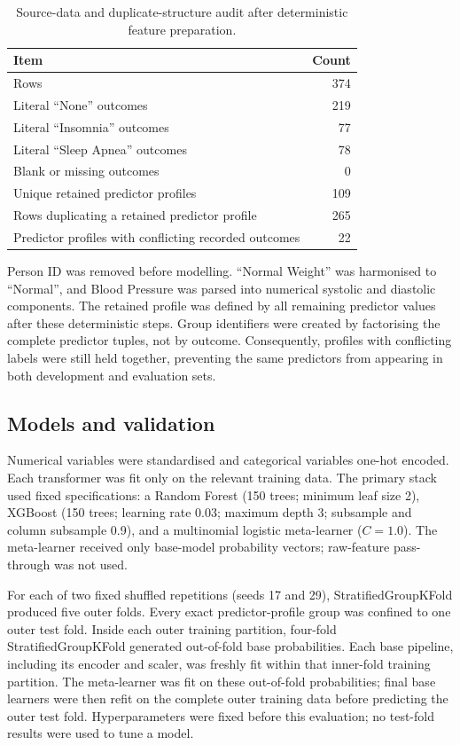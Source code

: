 \documentclass[preprint,12pt]{elsarticle}
\begin{document}
\begin{table}[t]
\centering
\caption{Source-data and duplicate-structure audit after deterministic feature preparation.}
\label{tab:audit}
\begin{tabular}{lr}
\toprule
Item & Count \\
\midrule
Rows & 374 \\
Literal ``None'' outcomes & 219 \\
Literal ``Insomnia'' outcomes & 77 \\
Literal ``Sleep Apnea'' outcomes & 78 \\
Blank or missing outcomes & 0 \\
Unique retained predictor profiles & 109 \\
Rows duplicating a retained predictor profile & 265 \\
Predictor profiles with conflicting recorded outcomes & 22 \\
\bottomrule
\end{tabular}
\end{table}

Person ID was removed before modelling. ``Normal Weight'' was harmonised to ``Normal'', and Blood Pressure was parsed into numerical systolic and diastolic components. The retained profile was defined by all remaining predictor values after these deterministic steps. Group identifiers were created by factorising the complete predictor tuples, not by outcome. Consequently, profiles with conflicting labels were still held together, preventing the same predictors from appearing in both development and evaluation sets.

\subsection{Models and validation}

Numerical variables were standardised and categorical variables one-hot encoded. Each transformer was fit only on the relevant training data. The primary stack used fixed specifications: a Random Forest (150 trees; minimum leaf size 2), XGBoost (150 trees; learning rate 0.03; maximum depth 3; subsample and column subsample 0.9), and a multinomial logistic meta-learner ($C=1.0$). The meta-learner received only base-model probability vectors; raw-feature pass-through was not used.

For each of two fixed shuffled repetitions (seeds 17 and 29), StratifiedGroupKFold produced five outer folds. Every exact predictor-profile group was confined to one outer test fold. Inside each outer training partition, four-fold StratifiedGroupKFold generated out-of-fold base probabilities. Each base pipeline, including its encoder and scaler, was freshly fit within that inner-fold training partition. The meta-learner was fit on these out-of-fold probabilities; final base learners were then refit on the complete outer training data before predicting the outer test fold. Hyperparameters were fixed before this evaluation; no test-fold results were used to tune a model.
\end{document}
